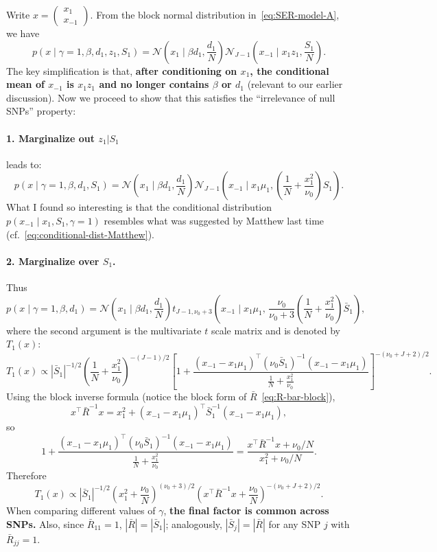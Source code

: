 \documentclass[11pt]{article}
\newcommand{\Normal}{\mathcal N}
\begin{document}
Write
\(
x=\begin{pmatrix}x_1\\x_{-1}\end{pmatrix}.
\)
From the block normal distribution in~\eqref{eq:SER-model-A}, we have
\[
p(x\mid \gamma=1,\beta,d_1,z_1,S_1)
=
\Normal\left(x_1\mid \beta d_1,\frac{d_1}{N}\right)
\Normal_{J-1}\left(x_{-1}\mid x_1z_1,\frac{S_1}{N}\right).
\]
The key simplification is that, \textbf{after conditioning on $x_1$, the conditional
mean of $x_{-1}$ is $x_1z_1$ and no longer contains $\beta$ or $d_1$} (relevant to our earlier discussion). Now we proceed to show that this satisfies the ``irrelevance of null SNPs'' property:
\paragraph{1. Marginalize out $z_1 | S_1$} leads to:
\[
p(x\mid \gamma=1,\beta,d_1,S_1)
=
\Normal\left(x_1\mid \beta d_1,\frac{d_1}{N}\right)
\Normal_{J-1}\left(
x_{-1}\mid x_1\mu_1,
\left(\frac{1}{N}+\frac{x_1^2}{\nu_0}\right)S_1
\right).
\]
What I found so interesting is that the conditional distribution $p(x_{-1}\mid x_1,S_1,\gamma=1)$ resembles what was suggested by Matthew last time (cf.~\eqref{eq:conditional-dist-Matthew}).

\paragraph{2. Marginalize over $S_1$.}
Thus
\[
p(x\mid \gamma=1,\beta,d_1)
=
\Normal\left(x_1\mid \beta d_1,\frac{d_1}{N}\right)
t_{J-1,\nu_0+3}\left(
x_{-1}\mid x_1\mu_1,\,
\frac{\nu_0}{\nu_0+3}\left(\frac{1}{N}+\frac{x_1^2}{\nu_0}\right)\bar S_1
\right),
\]
where the second argument is the multivariate $t$ scale matrix and is denoted by $T_1(x)$:
\[
T_1(x) \propto |\bar S_1|^{-1/2}
\left(\frac{1}{N}+\frac{x_1^2}{\nu_0}\right)^{-(J-1)/2}
\left[
1+
\frac{
(x_{-1}-x_1\mu_1)^\top(\nu_0\bar S_1)^{-1}
(x_{-1}-x_1\mu_1)
}{\frac{1}{N}+\frac{x_1^2}{\nu_0}}
\right]^{-(\nu_0+J+2)/2}.
\]
Using the block inverse formula (notice the block form of $\bar R$~\eqref{eq:R-bar-block}),
\[
x^\top\bar R^{-1}x
=
x_1^2+
(x_{-1}-x_1\mu_1)^\top\bar S_1^{-1}
(x_{-1}-x_1\mu_1),
\]
so
\[
1+
\frac{
(x_{-1}-x_1\mu_1)^\top(\nu_0\bar S_1)^{-1}
(x_{-1}-x_1\mu_1)
}{\frac{1}{N}+\frac{x_1^2}{\nu_0}}
=
\frac{x^\top\bar R^{-1}x+\nu_0/N}{x_1^2+\nu_0/N}.
\]
Therefore
\begin{equation}\label{eq:T_1}
T_1(x)
\propto
|\bar S_1|^{-1/2}
\left(x_1^2+\frac{\nu_0}{N}\right)^{(\nu_0+3)/2}
\left(x^\top\bar R^{-1}x+\frac{\nu_0}{N}\right)^{-(\nu_0+J+2)/2}.
\end{equation}
When comparing different values of $\gamma$, \textbf{the final factor is common across
SNPs.} Also, since $\bar R_{11}=1$, $|\bar R|=|\bar S_1|$; analogously,
$|\bar S_j|=|\bar R|$ for any SNP $j$ with $\bar R_{jj}=1$.
\end{document}
